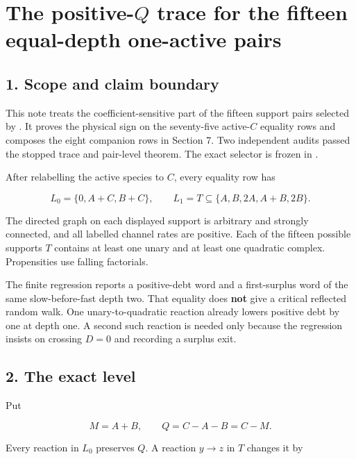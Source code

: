 \section{\texorpdfstring{The positive-\(Q\) trace for the fifteen
equal-depth one-active
pairs}{The positive-Q trace for the fifteen equal-depth one-active pairs}}

\subsection{1. Scope and claim boundary}

This note treats the coefficient-sensitive part of the fifteen support
pairs selected by \texttt{}. It
proves the physical sign on the seventy-five active-\(C\) equality rows
and composes the eight companion rows in Section 7. Two independent
audits passed the stopped trace and pair-level theorem. The exact
selector is frozen in
\texttt{}.

After relabelling the active species to \(C\), every equality row has

\[
 L_0=\{0,A+C,B+C\},\qquad
 L_1=T\subseteq\{A,B,2A,A+B,2B\}.                    \tag{1.1}
\]

The directed graph on each displayed support is arbitrary and strongly
connected, and all labelled channel rates are positive. Each of the
fifteen possible supports \(T\) contains at least one unary and at least
one quadratic complex. Propensities use falling factorials.

The finite regression reports a positive-debt word and a first-surplus
word of the same slow-before-fast depth two. That equality does
\textbf{not} give a critical reflected random walk. One
unary-to-quadratic reaction already lowers positive debt by one at depth
one. A second such reaction is needed only because the regression
insists on crossing \(D=0\) and recording a surplus exit.

\subsection{2. The exact level}

Put

\[
 M=A+B,\qquad Q=C-A-B=C-M.                            \tag{2.1}
\]

Every reaction in \(L_0\) preserves \(Q\). A reaction \(y\to z\) in
\(T\) changes it by

